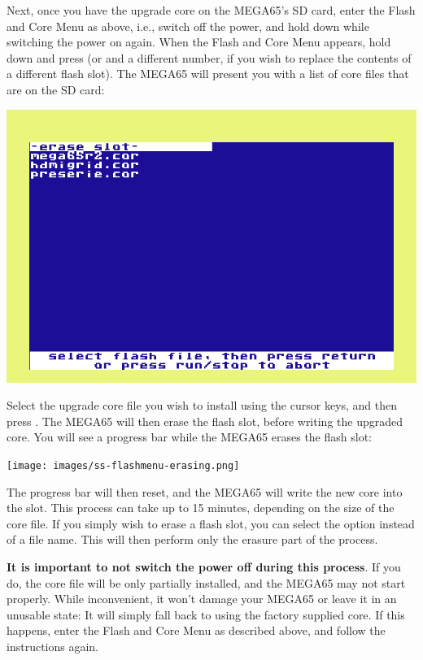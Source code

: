 Next, once you have the upgrade core on the MEGA65's SD card, enter the Flash and Core Menu as above,
i.e., switch off the power, and hold  down while switching the power on again.  When the Flash
and Core Menu appears, hold  down and press
 (or  and a different number, if you wish to replace the
contents of a different flash slot). The MEGA65
will present you with a list of core files that are on the SD card:

\begin{center}
\includegraphics[trim= 10mm  5mm 10mm 15mm,clip,width=0.7\linewidth]{images/ss-flashmenu-selectcore.png}
\end{center}

Select the upgrade core file you wish to
install using the cursor keys, and then press .  The MEGA65 will then erase
the flash slot, before writing the upgraded core.  You will see a progress bar while the MEGA65 erases
the flash slot:

\begin{center}
\texttt{[image: images/ss-flashmenu-erasing.png]}
\end{center}

The progress bar will then reset, and the MEGA65 will
write the new core into the slot. This process can take up to 15
minutes, depending on the size of the core file.  If you simply wish
to erase a flash slot, you can select the
 option instead of a file name. This will then perform
only the erasure part of the process.

{\bf It is important to not switch the power off during this process}. If you do, the core file will be
only partially installed, and the MEGA65 may not start properly.
While
inconvenient, it won't damage your MEGA65 or leave it
in an unusable state: It will simply fall back to using the factory
supplied core.
If this happens, enter the Flash and Core Menu
as described above, and follow the instructions again.

